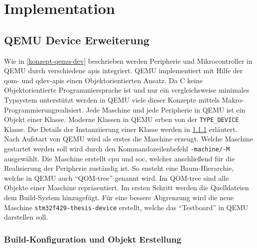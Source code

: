 

\clearpage

\chapter{Implementation}

\section{QEMU Device Erweiterung}

Wie in \ref{konzept-qemu-dev} beschrieben werden Peripherie und Mikrocontroller
in QEMU durch verschiedene \acp{api} integriert.
QEMU implementiert mit Hilfe der \ac{qom}- und \ac{qdev}-\acp{api} einen
Objektorientierten Ansatz.
Da C keine Objektorientierte Programmiersprache ist und nur ein vergleichsweise
minimales Typsystem unterstützt werden in QEMU viele dieser Konzepte mittels
Makro-Programmierung\footnotemark[1] realisiert.
\newline
Jede Maschine und jede Peripherie in QEMU ist ein Objekt einer Klasse.
Moderne Klassen in QEMU erben von der \texttt{TYPE\_DEVICE} Klasse.
Die Details der Instanziierung einer Klasse werden in
\ref{sec:qemu-device-build-obj} erläutert.
Nach Aufstart von QEMU wird als erstes die Maschine erzeugt.
Welche Maschine gestartet werden soll wird durch den Kommandozeilenbefehl
\texttt{-machine/-M} ausgewählt.
Die Maschine erstellt \ac{cpu} und \ac{soc}, welcher anschließend für die
Realisierung der Peripherie zuständig ist.
So ensteht eine Baum-Hierarchie, welche in QEMU auch \enquote{QOM-tree} genannt
wird.
Im QOM-tree sind alle Objekte einer Maschine repräsentiert.
\newline
Im ersten Schritt werden die Quelldateien dem Build-System hinzugefügt.
Für eine bessere Abgrenzung wird die neue Maschine
\texttt{stm32f429-thesis-device} erstellt, welche das \enquote{Testboard} in
QEMU darstellen soll.

\subsection{Build-Konfiguration und Objekt Erstellung}
\label{sec:qemu-device-build-obj}

